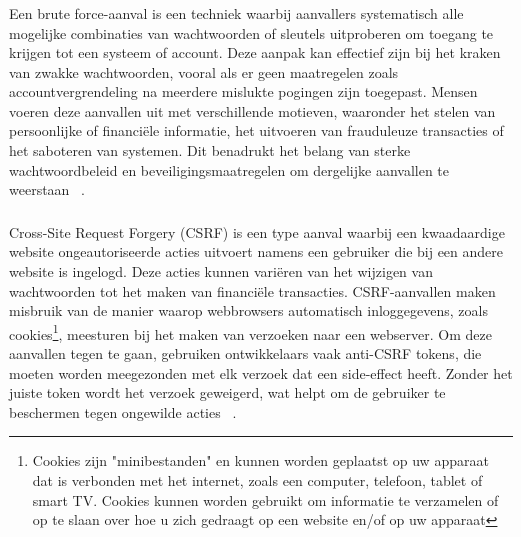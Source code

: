 \subsubsection{}
\label{sec:brute force aanvallen}
Een brute force-aanval is een techniek waarbij aanvallers systematisch alle mogelijke combinaties van wachtwoorden of sleutels uitproberen om toegang te krijgen tot een 
systeem of account. Deze aanpak kan effectief zijn bij het kraken van zwakke wachtwoorden, vooral als er geen maatregelen zoals accountvergrendeling na meerdere mislukte 
pogingen zijn toegepast. Mensen voeren deze aanvallen uit met verschillende motieven, waaronder het stelen van persoonlijke of financiële informatie, het uitvoeren van 
frauduleuze transacties of het saboteren van systemen. Dit benadrukt het belang van sterke wachtwoordbeleid en beveiligingsmaatregelen om dergelijke aanvallen te weerstaan
~\autocite{Djukanovic2020}.

\subsubsection{}
\label{sec:brute force aanvallen}
Cross-Site Request Forgery (CSRF) is een type aanval waarbij een kwaadaardige website ongeautoriseerde acties uitvoert namens een gebruiker die bij een andere website is 
ingelogd. Deze acties kunnen variëren van het wijzigen van wachtwoorden tot het maken van financiële transacties. CSRF-aanvallen maken misbruik van de manier waarop 
webbrowsers automatisch inloggegevens, zoals cookies\footnote{Cookies zijn "minibestanden" en kunnen worden geplaatst op uw apparaat dat is verbonden met het internet, 
zoals een computer, telefoon, tablet of smart TV. Cookies kunnen worden gebruikt om informatie te verzamelen of op te slaan over hoe u zich gedraagt op een website 
en/of op uw apparaat}, meesturen bij het maken van verzoeken naar een webserver. Om deze aanvallen tegen te gaan, gebruiken ontwikkelaars 
vaak anti-CSRF tokens, die moeten worden meegezonden met elk verzoek dat een side-effect heeft. Zonder het juiste token wordt het verzoek geweigerd, wat helpt om de 
gebruiker te beschermen tegen ongewilde acties ~\autocite{B.I.2024}.

